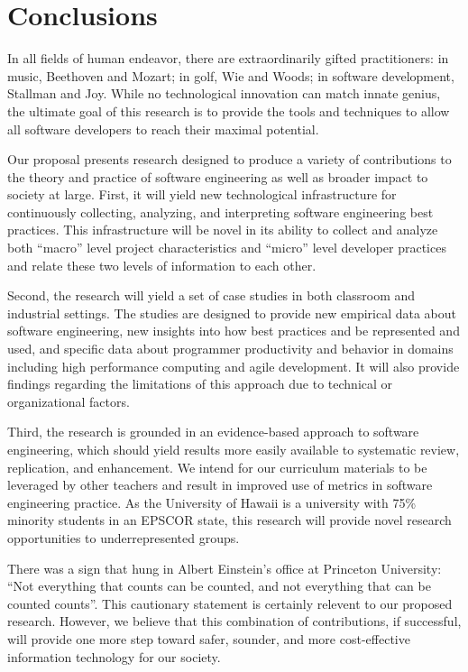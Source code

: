 \section{Conclusions}

In all fields of human endeavor, there are extraordinarily gifted
practitioners: in music, Beethoven and Mozart; in golf, Wie and
Woods; in software development, Stallman and Joy.  While no technological
innovation can match innate genius, the ultimate goal of this research is
to provide the tools and techniques to allow all software developers to
reach their maximal potential.

Our proposal presents research designed to produce a variety of
contributions to the theory and practice of software engineering as well as
broader impact to society at large.  First, it will yield new technological
infrastructure for continuously collecting, analyzing, and interpreting software
engineering best practices.  This infrastructure will be novel in its
ability to collect and analyze both ``macro'' level project characteristics
and ``micro'' level developer practices and relate these two levels of
information to each other.  

Second, the research will yield a set of case studies in both classroom and
industrial settings.  The studies are designed to provide new empirical
data about software engineering, new insights into how best practices and
be represented and used, and specific data about programmer productivity
and behavior in domains including  high performance computing and 
agile development.  It will also provide findings regarding the limitations of
this approach due to technical or organizational factors. 

Third, the research is grounded in an evidence-based approach to software
engineering, which should yield results more easily available to systematic
review, replication, and enhancement.  We intend for our curriculum
materials to be leveraged by other teachers and result in improved use of
metrics in software engineering practice.  As the University of Hawaii is a
university with 75\% minority students in an EPSCOR state, this research
will provide novel research opportunities to underrepresented groups.

There was a sign that hung in Albert Einstein's office at Princeton
University: ``Not everything that counts can be counted, and not everything
that can be counted counts''.  This cautionary statement is certainly
relevent to our proposed research.  However, we believe that this
combination of contributions, if successful, will provide one more step
toward safer, sounder, and more cost-effective information technology for
our society.










